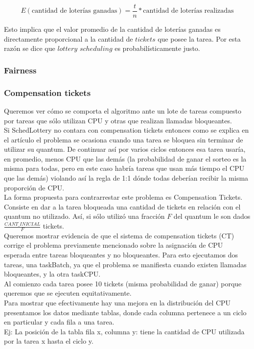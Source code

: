 \[
	E(\text{cantidad de loter\'ias ganadas}) = \frac{t}{n}*\text{cantidad de loter\'ias realizadas}
\]

Esto implica que el valor promedio de la cantidad de loter\'ias ganadas es directamente proporcional a la cantidad de $tickets$ que posee la tarea. Por esta raz\'on se dice que $lottery$ $scheduling$ es probabil\'isticamente justo.

\subsubsection{Fairness}

\subsubsection{Compensation tickets}

Queremos ver cómo se comporta el algoritmo ante un lote de tareas compuesto por
tareas que sólo utilizan CPU y otras que realizan llamadas bloqueantes.\\

Si SchedLottery no contara con compensation tickets entonces como se explica en el artículo \cite[Sec. 3.4]{SchedLottery} el problema se 
ocasiona cuando una tarea se bloquea sin terminar de utilizar su quantum.
De continuar así por varios ciclos entonces esa tarea usaría, en promedio, menos CPU que las demás
(la probabilidad de ganar el sorteo es la misma para todas, pero en este caso habría tareas que
usan más tiempo el CPU que las demás)
violando así la regla de 1:1 dónde todas deberían recibir la misma proporción de CPU.\\

La forma propuesta para contrarrestar este problema es Compensation Tickets. 
Consiste en dar a la tarea bloqueada una cantidad de tickets en relación con el quantum no utilizado.
Así, si sólo utilizó una fracción $F$ del quantum le son dados $\frac{CANT\_INICIAL}{F}$ tickets.\\

Queremos mostrar evidencia de que el sistema de compensation tickets (CT) corrige el problema
previamente mencionado sobre la asignación de CPU esperada entre tareas bloqueantes y no bloqueantes.
Para esto ejecutamos dos tareas, una taskBatch, ya que el problema se manifiesta cuando existen llamadas bloqueantes, y la otra taskCPU.\\

Al comienzo cada tarea posee 10 tickets (misma probabilidad de ganar) porque queremos que se ejecuten equitativamente.\\
Para mostrar que efectivamente hay una mejora en la distribución del CPU presentamos los datos mediante tablas, donde cada columna pertenece a un ciclo en particular 
y cada fila a una tarea.\\
Ej: La posición de la tabla fila x, columna y: tiene la cantidad de CPU utilizada por la tarea x hasta el ciclo y.\\

